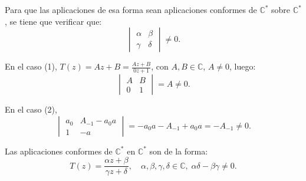 Para que las aplicaciones de esa forma sean aplicaciones conformes de $\mathbb{C}^\ast$ sobre $\mathbb{C}^\ast$, se tiene que verificar que:
$$\begin{vmatrix}
        \alpha & \beta  \\
        \gamma & \delta
    \end{vmatrix} \neq 0.$$

En el caso (1), $T(z) = Az + B = \frac{Az + B}{0z + 1}$, con $A, B \in \mathbb{C}$, $A \neq 0$, luego:
$$\begin{vmatrix}
        A & B \\
        0 & 1
    \end{vmatrix} = A \neq 0.$$

En el caso (2),
$$\begin{vmatrix}
        a_0 & A_{-1} - a_0a \\
        1   & -a
    \end{vmatrix} = -a_0a - A_{-1} + a_0a = -A_{-1} \neq 0.$$

\begin{theorem}
    Las aplicaciones conformes de $\mathbb{C}^\ast$ en $\mathbb{C}^\ast$ son de la forma:
    $$T(z) = \frac{\alpha z + \beta}{\gamma z + \delta}, \quad \alpha, \beta, \gamma, \delta \in \mathbb{C}, \; \alpha\delta - \beta\gamma \neq 0.$$
\end{theorem}

